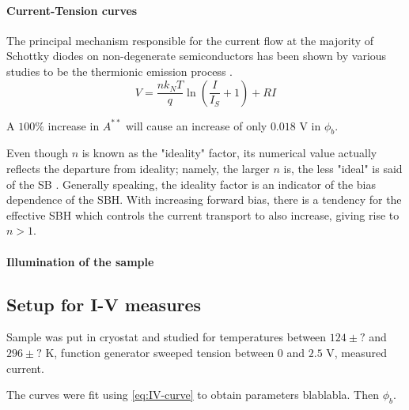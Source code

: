 \paragraph{Current-Tension curves}
The principal mechanism responsible for the current flow at the majority of Schottky diodes on non-degenerate semiconductors has been shown by various studies to be the thermionic emission process \cite{tung_recent_2001}.
\begin{equation} \label{eq:IV-curve}
    V = \frac{n k_N T}{q} \ln \left( \frac{I}{I_S} +1 \right) + RI
\end{equation}


A $100 \%$ increase in $A^{**}$ will cause an increase of only $0.018$ V in $\phi_b$.


Even though $n$ is known as the  "ideality" factor, its numerical value actually reflects the departure from ideality; namely, the larger $n$ is, the less "ideal" is said of the SB \cite{tung_recent_2001}.
Generally speaking, the ideality factor is an indicator of the bias dependence of the SBH. With increasing forward bias, there is a tendency for the effective SBH which controls the current transport to also increase, giving rise to $n > 1$.

\paragraph{Illumination of the sample}


\subsection{Setup for I-V measures}
Sample was put in cryostat and studied for temperatures between $124 \pm ?$ and $296\pm?$ K, function generator sweeped tension between $0$ and $2.5$ V, measured current.

The curves were fit using \autoref{eq:IV-curve} to obtain parameters blablabla.
Then $\phi_b$.
